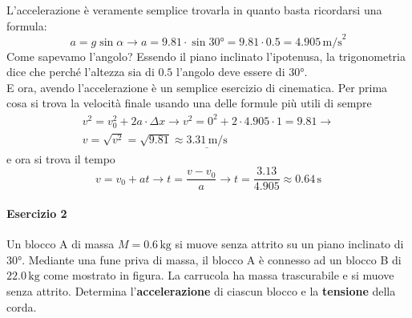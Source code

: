 L'accelerazione è veramente semplice trovarla in quanto basta ricordarsi una formula:
\begin{equation*}
a = g\sin\alpha \rightarrow a = 9.81\cdot\sin\ang{30} = 9.81 \cdot 0.5 = \boxed{4.905\,\text{m/s}^2}
\end{equation*}
Come sapevamo l'angolo? Essendo il piano inclinato l'ipotenusa, la trigonometria dice che perché
l'altezza sia di $0.5$ l'angolo deve essere di $\ang{30}$.\\[\baselineskip]
E ora, avendo l'accelerazione è un semplice esercizio di cinematica. Per prima cosa si trova la
velocità finale usando una delle formule più utili di sempre
\begin{align*}
v^2= v_0^2+2a\cdot\Delta x \rightarrow v^2 = 0^2 + 2\cdot4.905\cdot1 = 9.81 \rightarrow\\
v = \sqrt{v^2} = \sqrt{9.81} \approx \underline{3.31\,\text{m/s}}
\end{align*}
e ora si trova il tempo
\begin{equation*}
v = v_0 + at \rightarrow t = \frac{v-v_0}{a} \rightarrow t = \frac{3.13}{4.905} \approx 
\boxed{0.64\,\text{s}}
\end{equation*}

\paragraph{Esercizio 2}
Un blocco A di massa $M = 0.6\,\text{kg}$ si muove senza attrito su un piano inclinato di $\ang{30}$. 
Mediante una fune priva di massa, il blocco A è connesso ad un blocco B di $22.0\,\text{kg}$ come 
mostrato in figura. La carrucola ha massa trascurabile e si muove senza attrito. Determina 
l'\textbf{accelerazione} di ciascun blocco e la \textbf{tensione} della corda.

\begin{center}
\end{center}
\divisor

